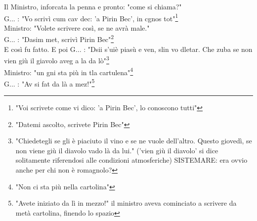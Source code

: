 Il Ministro, inforcata la penna e pronto: "come si chiama?"\\
G\:.\:.\:. : "Vo scrivì cum cav dec: 'a Pirin Bec', in cgnos tot"\footnote{"Voi scrivete come vi dico: 'a Pirin Bec', lo conoscono tutti"}\\
Ministro: "Volete scrivere così, se ne avrà male."\\
G\:.\:.\:. : "Dasim met, scrivì Pirin Bec"\footnote{"Datemi ascolto, scrivete Pirin Bec"}\\
E così fu fatto. E poi G\:.\:.\:. : "Dsii s'uiè piasù e ven, slin vo dletar. Che zuba se non vien giù il giavolo aveg a la da lò"\footnote{"Chiedetegli se gli è piaciuto il vino e se ne vuole dell'altro. Questo giovedì, se non viene giù il diavolo vado là da lui." ('vien giù il diavolo' si dice solitamente riferendosi alle condizioni atmosferiche) SISTEMARE: era ovvio anche per chi non è romagnolo?}\\
Ministro: "un gni sta più in tla cartulena"\footnote{"Non ci sta più nella cartolina"}\\
G\:.\:.\:. : "Av si fat da là a mez!"\footnote{"Avete iniziato da lì in mezzo!" il ministro aveva cominciato a scrivere da metà cartolina, finendo lo spazio}

